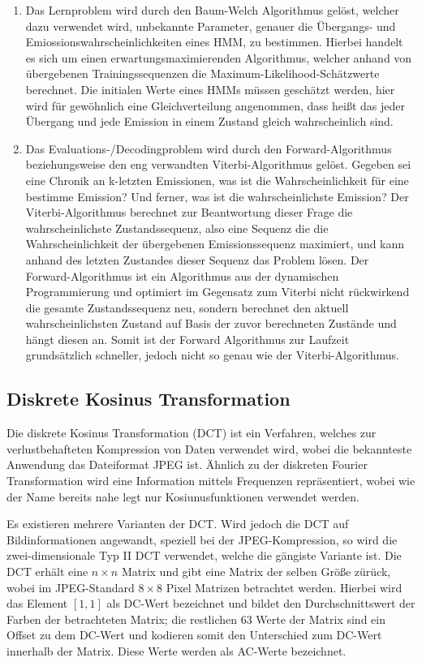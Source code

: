 \begin{enumerate}
	\item Das Lernproblem wird durch den Baum-Welch Algorithmus gelöst, welcher dazu verwendet wird, unbekannte Parameter, genauer die Übergangs- und Emiossionswahrscheinlichkeiten eines HMM, zu bestimmen.
 Hierbei handelt es sich um einen erwartungsmaximierenden Algorithmus, welcher anhand von übergebenen Trainingssequenzen die Maximum-Likelihood-Schätzwerte berechnet.
 Die initialen Werte eines HMMs müssen geschätzt werden, hier wird für gewöhnlich eine Gleichverteilung angenommen, dass heißt das jeder Übergang und jede Emission in einem Zustand gleich wahrscheinlich sind.

	\item Das Evaluations-/Decodingproblem wird durch den Forward-Algorithmus beziehungsweise den eng verwandten Viterbi-Algorithmus gelöst.
 Gegeben sei eine Chronik an k-letzten Emissionen, was ist die Wahrscheinlichkeit für eine bestimme Emission? Und ferner, was ist die wahrscheinlichste Emission? Der Viterbi-Algorithmus berechnet zur Beantwortung dieser Frage die wahrscheinlichste Zustandssequenz, also eine Sequenz die die Wahrscheinlichkeit der übergebenen Emissionssequenz maximiert, und kann anhand des letzten Zustandes dieser Sequenz das Problem lösen.
 Der Forward-Algorithmus ist ein Algorithmus aus der dynamischen Programmierung und optimiert im Gegensatz zum Viterbi nicht rückwirkend die gesamte Zustandssequenz neu, sondern berechnet den aktuell wahrscheinlichsten Zustand auf Basis der zuvor berechneten Zustände und hängt diesen an.
 Somit ist der Forward Algorithmus zur Laufzeit grundsätzlich schneller, jedoch nicht so genau wie der Viterbi-Algorithmus.
 \end{enumerate}


\subsection{Diskrete Kosinus Transformation}

Die diskrete Kosinus Transformation (DCT) ist ein Verfahren, welches zur verlustbehafteten Kompression von Daten verwendet wird, wobei die bekannteste Anwendung das Dateiformat JPEG ist.
 Ähnlich zu der diskreten Fourier Transformation wird eine Information mittels Frequenzen repräsentiert, wobei wie der Name bereits nahe legt nur Kosiunusfunktionen verwendet werden.
 

Es existieren mehrere Varianten der DCT.
 Wird jedoch die DCT auf Bildinformationen angewandt, speziell bei der JPEG-Kompression, so wird die zwei-dimensionale Typ II DCT verwendet, welche die gängiste Variante ist.
 Die DCT erhält eine $n \times  n$ Matrix und gibt eine Matrix der selben Größe zürück, wobei im JPEG-Standard $8 \times 8$ Pixel Matrizen betrachtet werden.
 Hierbei wird das Element $[1,1]$ als DC-Wert bezeichnet und bildet den Durchschnittswert der Farben der betrachteten Matrix; die restlichen 63 Werte der Matrix sind ein Offset zu dem DC-Wert und kodieren somit den Unterschied zum DC-Wert innerhalb der Matrix.
 Diese Werte werden als AC-Werte bezeichnet.


